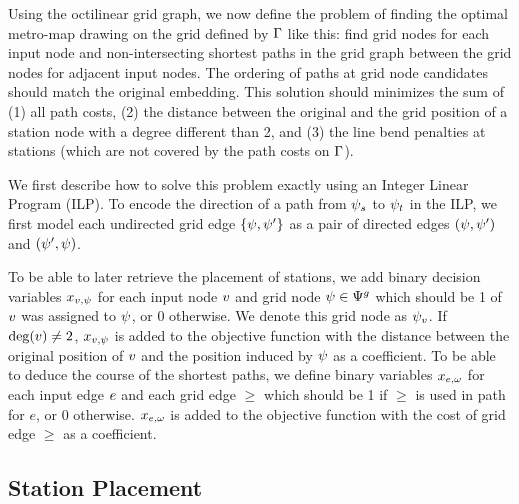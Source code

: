 \documentclass[sigconf]{acmart}
\begin{document}
Using the octilinear grid graph, we now define the problem of finding the optimal metro-map drawing on the grid defined by $\Gamma$ like this: find grid nodes for each input node and non-intersecting shortest paths in the grid graph between the grid nodes for adjacent input nodes.
The ordering of paths at grid node candidates should match the original embedding.
This solution should minimizes the sum of (1) all path costs, (2) the distance between the original and the grid position of a station node with a degree different than 2, and (3) the line bend penalties at stations (which are not covered by the path costs on $\Gamma$).

We first describe how to solve this problem exactly using an Integer Linear Program (ILP).
To encode the direction of a path from $\psi_s$ to $\psi_t$ in the ILP, we first model each undirected grid edge $\{\psi, \psi'\}$ as a pair of directed edges $(\psi, \psi')$ and $(\psi', \psi)$.

To be able to later retrieve the placement of stations, we add binary decision variables $x_{v,\psi}$ for each input node $v$ and grid node $\psi \in \Psi^g$ which should be 1 of $v$ was assigned to $\psi$, or 0 otherwise.
We denote this grid node as $\psi_v$.
If $\deg(v) \neq 2$, $x_{v,\psi}$ is added to the objective function with the distance between the original position of $v$ and the position induced by $\psi$ as a coefficient.
To be able to deduce the course of the shortest paths, we define binary variables $x_{e,\omega}$ for each input edge $e$ and each grid edge $\ge$ which should be 1 if $\ge$ is used in path for $e$, or 0 otherwise.
$x_{e,\omega}$ is added to the objective function with the cost of grid edge $\ge$ as a coefficient.

\subsection{Station Placement}
\end{document}
